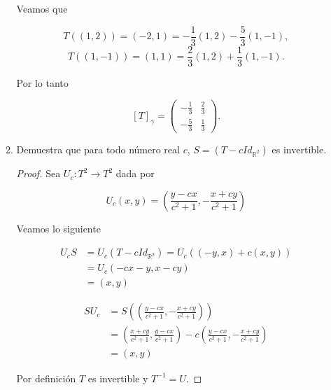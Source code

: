 \documentclass[letterpaper]{article}
\theoremstyle{definition}
\theoremstyle{lemathm}
\theoremstyle{lemademthm}
\newcommand{\R}{\mathbb{R}}
\begin{document}
\begin{enumerate}
\begin{enumerate}
			Veamos que

			\[T((1,2)) = (-2,1) = -\frac{1}{3}(1,2) - \frac{5}{3}(1,-1),\]
			\[T((1,-1)) = (1,1) = \frac{2}{3}(1,2) + \frac{1}{3}(1,-1).\]

			Por lo tanto

			\[[T]_\gamma = \begin{pmatrix}
				-\frac{1}{3} & \frac{2}{3}\\
				-\frac{5}{3} & \frac{1}{3}
			\end{pmatrix}.\]

			\item Demuestra que para todo número real $c$, $S = (T - cId_{\R^2})$ es invertible.
			
			\begin{proof}
			
				Sea $U_c: T^2 \rightarrow T^2$ dada por

				\[U_c(x,y) = \left(\frac{y - cx}{c^2 + 1}, -\frac{x + cy}{c^2 + 1}\right)\]

				Veamos lo siguiente

				\begin{align*}
					U_cS &= U_c(T - cId_{\R^2}) = U_c((-y,x) + c(x,y))\\
					&= U_c(-cx-y,x-cy)\\
					&= (x,y)
				\end{align*}

				\begin{align*}
					SU_c &= S\left(\left(\frac{y - cx}{c^2 + 1}, -\frac{x + cy}{c^2 + 1}\right)\right)\\
					&= \left(\frac{x + cy}{c^2 + 1}, \frac{y - cx}{c^2 + 1}\right) - c\left(\frac{y - cx}{c^2 + 1}, -\frac{x + cy}{c^2 + 1}\right)\\
					&= (x,y)
				\end{align*}

				Por definición $T$ es invertible y $T^{-1} = U$.

			\end{proof}

		\end{enumerate}

	\end{enumerate}

	
\end{document}

